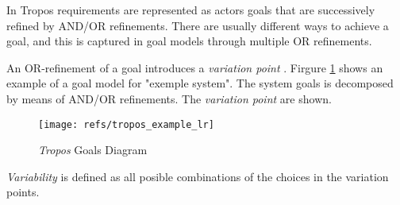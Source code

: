In Tropos requirements are represented as actors goals that are successively refined by AND/OR refinements. There are usually different ways to achieve a goal, and this is captured in goal models through multiple OR refinements.

An OR-refinement of a goal introduces a \emph{variation point} \cite{yu_goals_2008}.
Firgure \ref{fig:goal_model_example} shows an example of a goal model for "exemple system". The system goals is decomposed by means of AND/OR refinements. The \emph{variation point} \cite{yu_goals_2008} are shown.

\begin{figure}
  \centering
  \texttt{[image: refs/tropos\_example\_lr]}
  \caption{\emph{Tropos} Goals Diagram}
  \label{fig:goal_model_example}
\end{figure}

\emph{Variability} is defined as all posible combinations of the choices in the variation points\cite{yu_goals_2008}.
